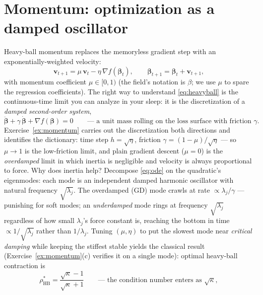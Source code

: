 \documentclass[11pt]{article}
\numberwithin{equation}{section}
\theoremstyle{plain}
\theoremstyle{definition}
\theoremstyle{remark}
\newcommand{\bbeta}{\bm{\beta}}
\begin{document}
\section{Momentum: optimization as a damped oscillator}\label{sec:momentum}

Heavy-ball momentum replaces the memoryless gradient step with an exponentially-weighted velocity:
\begin{equation}
\bm{v}_{t+1} = \mu\, \bm{v}_t - \eta\, \nabla f(\bbeta_t),
\qquad
\bbeta_{t+1} = \bbeta_t + \bm{v}_{t+1},
\label{eq:heavyball}
\end{equation}
with momentum coefficient $\mu \in [0, 1)$ (the field's notation is $\beta$; we use $\mu$ to spare the regression coefficients). The right way to understand \eqref{eq:heavyball} is the continuous-time limit you can analyze in your sleep: it is the discretization of a \emph{damped second-order system},
\begin{equation}
\ddot{\bbeta} + \gamma\, \dot{\bbeta} + \nabla f(\bbeta) = 0
\qquad\text{--- a unit mass rolling on the loss surface with friction } \gamma .
\label{eq:ode}
\end{equation}
Exercise~\ref{ex:momentum} carries out the discretization both directions and identifies the dictionary: time step $h = \sqrt{\eta}$, friction $\gamma = (1 - \mu)/\sqrt{\eta}$ --- so $\mu \to 1$ is the low-friction limit, and plain gradient descent ($\mu = 0$) is the \emph{overdamped} limit in which inertia is negligible and velocity is always proportional to force. Why does inertia help? Decompose \eqref{eq:ode} on the quadratic's eigenmodes: each mode is an independent damped harmonic oscillator with natural frequency $\sqrt{\lambda_j}$. The overdamped (GD) mode crawls at rate $\propto \lambda_j/\gamma$ --- punishing for soft modes; an \emph{underdamped} mode rings at frequency $\sqrt{\lambda_j}$ regardless of how small $\lambda_j$'s force constant is, reaching the bottom in time $\propto 1/\sqrt{\lambda_j}$ rather than $1/\lambda_j$. Tuning $(\mu, \eta)$ to put the slowest mode near \emph{critical damping} while keeping the stiffest stable yields the classical result (Exercise~\ref{ex:momentum}(c) verifies it on a single mode): optimal heavy-ball contraction is
\begin{equation}
\rho^\ast_{\text{HB}} = \frac{\sqrt{\kappa} - 1}{\sqrt{\kappa} + 1}
\qquad\text{--- the condition number enters as } \sqrt{\kappa},
\label{eq:hbrate}
\end{equation}
\end{document}
